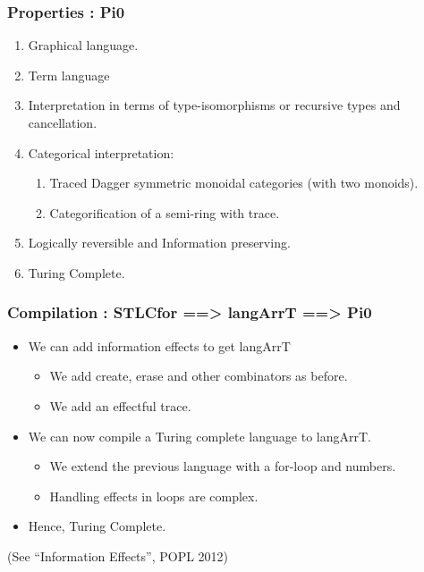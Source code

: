 \documentclass[svgnames,11pt]{beamer}
\begin{document}
\begin{frame}
\frametitle{Properties : {{Pi0}} }

\begin{enumerate}

\vfill
\item Graphical language.  

\vfill
\item Term language

\vfill
\item Interpretation in terms of type-isomorphisms or recursive types
  and cancellation.

\vfill
\item Categorical interpretation: 

  \begin{enumerate}
  \item Traced Dagger symmetric monoidal categories (with two monoids). 
  \item Categorification of a semi-ring with trace. 
  \end{enumerate}

\vfill
\item Logically reversible and Information preserving. 

\vfill
\item Turing Complete. 

\end{enumerate}

\end{frame}


\begin{frame}
\frametitle{Compilation : {{STLCfor ==> langArrT ==> Pi0}} }

\begin{itemize}

\vfill
\item We can add information effects to get {{langArrT}}
  \begin{itemize}
  \item We add {{create}}, {{erase}} and other combinators as before.
  \item We add an effectful {{trace}}.
  \end{itemize}

\vfill
\item We can now compile a Turing complete language to {{langArrT}}. 
  \begin{itemize}
  \item We extend the previous language with a for-loop and numbers.
  \item Handling effects in loops are complex. 
  \end{itemize}

\vfill
\item Hence, Turing Complete. 

\vfill
\end{itemize}

\begin{scriptsize}
  (See ``Information Effects'', POPL 2012)
\end{scriptsize}
\end{frame}
\end{document}
